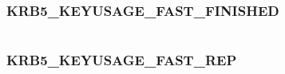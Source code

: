 \documentclass[letterpaper,10pt,english]{sphinxmanual}
\begin{document}
\begin{fulllineitems}
\label{appdev/refs/macros/KRB5_KEYUSAGE_FAST_ENC:KRB5_KEYUSAGE_FAST_ENC}
\end{fulllineitems}


\begin{tabulary}{\linewidth}{|L|L|}
\hline

 & 
\\
\hline\end{tabulary}



\subsubsection{KRB5\_KEYUSAGE\_FAST\_FINISHED}
\label{appdev/refs/macros/KRB5_KEYUSAGE_FAST_FINISHED:krb5-keyusage-fast-finished-data}\label{appdev/refs/macros/KRB5_KEYUSAGE_FAST_FINISHED::doc}\label{appdev/refs/macros/KRB5_KEYUSAGE_FAST_FINISHED:krb5-keyusage-fast-finished}

\begin{fulllineitems}
\label{appdev/refs/macros/KRB5_KEYUSAGE_FAST_FINISHED:KRB5_KEYUSAGE_FAST_FINISHED}
\end{fulllineitems}


\begin{tabulary}{\linewidth}{|L|L|}
\hline

 & 
\\
\hline\end{tabulary}



\subsubsection{KRB5\_KEYUSAGE\_FAST\_REP}
\label{appdev/refs/macros/KRB5_KEYUSAGE_FAST_REP:krb5-keyusage-fast-rep-data}\label{appdev/refs/macros/KRB5_KEYUSAGE_FAST_REP::doc}\label{appdev/refs/macros/KRB5_KEYUSAGE_FAST_REP:krb5-keyusage-fast-rep}

\begin{fulllineitems}
\label{appdev/refs/macros/KRB5_KEYUSAGE_FAST_REP:KRB5_KEYUSAGE_FAST_REP}
\end{fulllineitems}
\end{document}
